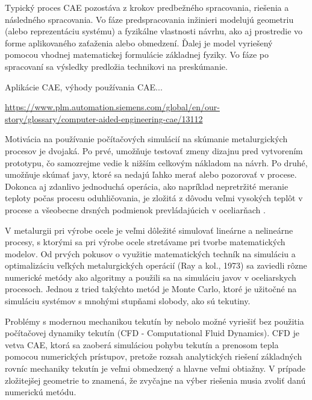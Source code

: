 \documentclass[]{tukediphc}
\begin{document}
Typický proces CAE pozostáva z krokov predbežného spracovania, riešenia a následného spracovania. Vo fáze predspracovania inžinieri modelujú geometriu (alebo reprezentáciu systému) a fyzikálne vlastnosti návrhu, ako aj prostredie vo forme aplikovaného zaťaženia alebo obmedzení. Ďalej je model vyriešený pomocou vhodnej matematickej formulácie základnej fyziky. Vo fáze po spracovaní sa výsledky predložia technikovi na preskúmanie.

Aplikácie CAE, výhody používania CAE...

\url{https://www.plm.automation.siemens.com/global/en/our-story/glossary/computer-aided-engineering-cae/13112}

Motivácia na používanie počítačových simulácií na skúmanie metalurgických procesov je dvojaká. Po prvé, umožňuje testovať zmeny dizajnu pred vytvorením prototypu, čo samozrejme vedie k nižším celkovým nákladom na návrh. Po druhé, umožňuje skúmať javy, ktoré sa nedajú ľahko merať alebo pozorovať v procese. Dokonca aj zdanlivo jednoduchá operácia, ako napríklad nepretržité meranie teploty počas procesu oduhličovania, je zložitá z dôvodu veľmi vysokých teplôt v procese a všeobecne drsných podmienok prevládajúcich v oceliarňach \citep{Ersson2018}.




V metalurgii pri výrobe ocele je veľmi dôležité simulovať lineárne a nelineárne procesy, s ktorými sa pri výrobe ocele stretávame pri tvorbe matematických modelov. Od prvých pokusov o využitie matematických techník na simuláciu a optimalizáciu veľkých metalurgických operácií (Ray a kol., 1973) sa zaviedli rôzne numerické metódy ako algoritmy a použili sa na simuláciu javov v oceliarskych procesoch. Jednou z tried takýchto metód je Monte Carlo, ktoré je užitočné na simuláciu systémov s mnohými stupňami slobody, ako sú tekutiny.

Problémy s modernou mechanikou tekutín by nebolo možné vyriešiť bez použitia počítačovej dynamiky tekutín (CFD - Computational Fluid Dynamics). CFD je vetva CAE, ktorá sa zaoberá simuláciou pohybu tekutín a prenosom tepla pomocou numerických prístupov, pretože rozsah analytických riešení základných rovníc mechaniky tekutín je veľmi obmedzený a hlavne veľmi obtiažny. V prípade zložitejšej geometrie to znamená, že zvyčajne na výber riešenia musia zvoliť danú numerickú metódu. 
\end{document}
